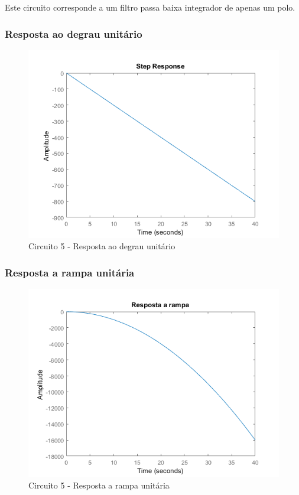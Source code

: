 \documentclass[a4paper, 12pt]{article}
\begin{document}
			Este circuito corresponde a um filtro passa baixa integrador de apenas um polo.	
			
			\subsubsection{Resposta ao degrau unitário}
			\begin{figure}[!ht]
				\centering
				\includegraphics[scale=0.71]{img/1g_circ5.png}
				\caption{Circuito 5 - Resposta ao degrau unitário}	
			\end{figure}					
			\subsubsection{Resposta a rampa unitária}
			\begin{figure}[!ht]
				\centering
				\includegraphics[scale=0.72]{img/1h_circ5.png}
				\caption{Circuito 5 - Resposta a rampa unitária}	
			\end{figure}		
			
\end{document}
